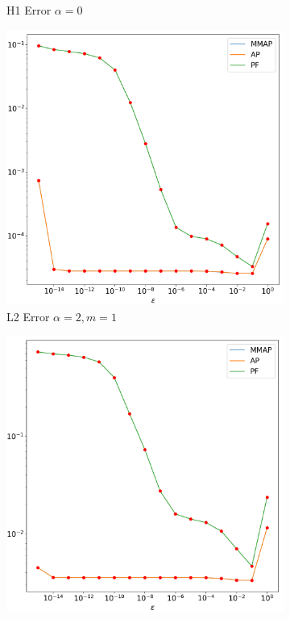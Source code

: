 \documentclass[12pt]{ociamthesis}
\begin{document}
\begin{figure}[H]
\begin{subfigure}{0.44\textwidth}
     \caption{H1 Error $\alpha=0$}
 \end{subfigure}
 \begin{subfigure}{0.44\textwidth}
     \includegraphics[width=\textwidth]{Pics/LHSims/E1b_MMAP_AP_PFL2.png}
     \caption{L2 Error $\alpha=2, m=1$} \label{E1_Mild_Ans}
 \end{subfigure}
 \begin{subfigure}{0.44\textwidth}
     \includegraphics[width=\textwidth]{Pics/LHSims/E1b_MMAP_AP_PFH1.png}

\end{subfigure}
\end{figure}
\end{document}
